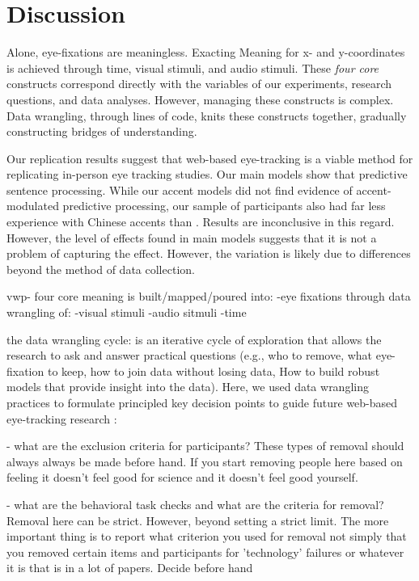 \section{Discussion}
Alone, eye-fixations are meaningless. Exacting Meaning for x- and y-coordinates is achieved
through time, visual stimuli, and audio stimuli. These \textit{four core} constructs correspond directly with the variables of our experiments, research questions, and data analyses. However, managing these constructs is complex. Data wrangling, through lines of code, knits these constructs together, gradually constructing bridges of understanding.

Our replication results suggest that web-based eye-tracking is a viable method for replicating in-person eye tracking studies. Our main models show that predictive sentence processing. While our accent models did not find evidence of accent-modulated predictive processing, our sample of participants also had far less experience with Chinese accents than \textcite{Porretta_et_al_2020}. Results are inconclusive in this regard. However, the level of effects found in main models suggests that it is not a problem of capturing the effect. However, the variation is likely due to differences beyond the method of data collection.


vwp- four core
meaning is built/mapped/poured into:
-eye fixations
through data wrangling of:
-visual stimuli
-audio sitmuli
-time


the data wrangling cycle: is an iterative cycle of exploration that allows the research to ask and answer practical questions (e.g., who to remove, what eye-fixation to keep, how to join data without losing data, How to build robust models that provide insight into the data). Here, we used data wrangling practices to formulate principled key decision points to guide future web-based eye-tracking research :

- what are the exclusion criteria for participants?
These types of removal should always always be made before hand. If you start removing people here based on feeling it doesn't feel good for science and it doesn't feel good yourself. 


- what are the behavioral task checks and what are the criteria for removal?
Removal here can be strict. However, beyond setting a strict limit. The more important thing is to report what criterion you used for removal not simply that you removed certain items and participants for 'technology' failures or whatever it is that is in a lot of papers. Decide before hand


